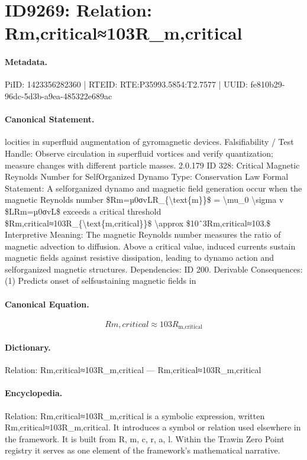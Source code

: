 \section*{ID9269: Relation: Rm,critical≈103R\_m,critical}
\paragraph{Metadata.}
PiID: 1423356282360 | RTEID: RTE:P35993.5854:T2.7577 | UUID: fe810b29-96dc-5d3b-a9ea-485322e689ac

\paragraph{Canonical Statement.}
locities in superfluid augmentation of gyromagnetic devices. Falsifiability / Test Handle: Observe circulation in superfluid vortices and verify quantization; measure changes with different particle masses. 2.0.179 ID 328: Critical Magnetic Reynolds Number for SelfOrganized Dynamo Type: Conservation Law Formal Statement: A selforganized dynamo and magnetic field generation occur when the magnetic Reynolds number \$Rm=µ0σvLR\_\{\textbackslash{}text\{m\}\}\$ = \textbackslash{}mu\_0 \textbackslash{}sigma v \$LRm=µ0σvL\$ exceeds a critical threshold \$Rm,critical≈103R\_\{\textbackslash{}text\{m,critical\}\}\$ \textbackslash{}approx \$10ˆ3Rm,critical≈103.\$ Interpretive Meaning: The magnetic Reynolds number measures the ratio of magnetic advection to diffusion. Above a critical value, induced currents sustain magnetic fields against resistive dissipation, leading to dynamo action and selforganized magnetic structures. Dependencies: ID 200. Derivable Consequences: (1) Predicts onset of selfsustaining magnetic fields in

\paragraph{Canonical Equation.}
\[
Rm,critical≈103R_{\text{m,critical}}
\]

\paragraph{Dictionary.}
Relation: Rm,critical≈103R\_m,critical — Rm,critical≈103R\_m,critical

\paragraph{Encyclopedia.}
Relation: Rm,critical≈103R\_m,critical is a symbolic expression, written Rm,critical≈103R\_m,critical. It introduces a symbol or relation used elsewhere in the framework. It is built from R, m, c, r, a, l. Within the Trawin Zero Point registry it serves as one element of the framework's mathematical narrative.
